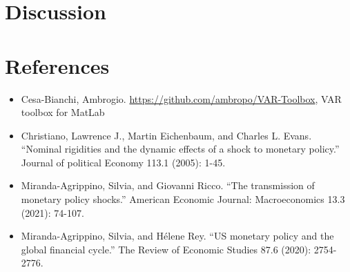 \documentclass[11pt,a4paper]{article}
\begin{document}
\section{Discussion}







\section*{References}
\begin{itemize}
    \item Cesa-Bianchi, Ambrogio. \url{https://github.com/ambropo/VAR-Toolbox}, VAR toolbox for MatLab
    \item Christiano, Lawrence J., Martin Eichenbaum, and Charles L. Evans. \enquote{Nominal rigidities and the dynamic effects of a shock to monetary policy.} Journal of political Economy 113.1 (2005): 1-45.
    \item Miranda-Agrippino, Silvia, and Giovanni Ricco. \enquote{The transmission of monetary policy shocks.} American Economic Journal: Macroeconomics 13.3 (2021): 74-107.
    \item Miranda-Agrippino, Silvia, and Hélene Rey. \enquote{US monetary policy and the global financial cycle.} The Review of Economic Studies 87.6 (2020): 2754-2776.
    
\end{itemize}
\end{document}
